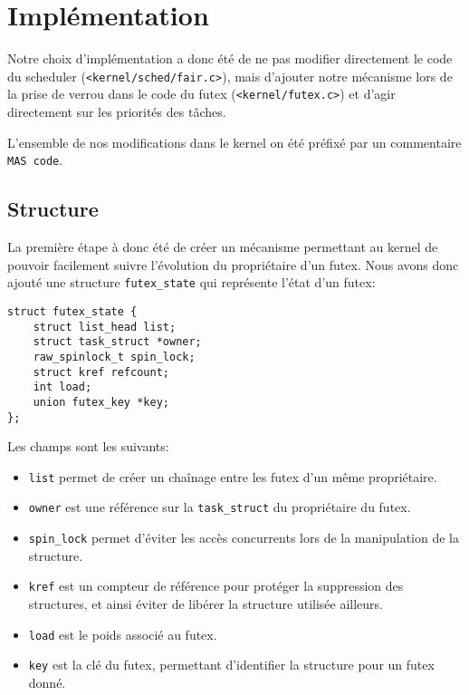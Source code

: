 \section{Implémentation}

Notre choix d'implémentation a donc été de ne pas modifier directement le code du scheduler (\verb|<kernel/sched/fair.c>|), mais d'ajouter notre mécanisme lors de la prise de
verrou dans le code
du futex (\verb|<kernel/futex.c>|) et d'agir directement sur les priorités des tâches.

L'ensemble de nos modifications dans le kernel on été préfixé par un commentaire \verb|MAS code|.

\subsection{Structure}

La première étape à donc été de créer un mécanisme permettant au kernel de pouvoir facilement
suivre l'évolution du propriétaire d'un futex.
Nous avons donc ajouté une structure \verb|futex_state| qui représente l'état d'un
futex:

\begin{lstlisting}[tabsize=4]
struct futex_state {
	struct list_head list;
	struct task_struct *owner;
	raw_spinlock_t spin_lock;
	struct kref refcount;
	int load;
	union futex_key *key;
};
\end{lstlisting}

Les champs sont les suivants:
\begin{itemize}
	\item \verb|list| permet de créer un chaînage entre les futex d'un même propriétaire.
	
	\item \verb|owner| est une référence sur la \verb|task_struct| du propriétaire du futex.
	
	\item \verb|spin_lock| permet d'éviter les accès concurrents lors de la manipulation de
	la structure.
	
	\item \verb|kref| est un compteur de référence pour protéger la suppression
	des structures, et ainsi éviter de libérer la structure utilisée ailleurs.
	
	\item \verb|load| est le poids associé au futex.
	
	\item \verb|key| est la clé du futex, permettant d'identifier la structure pour un 
	futex donné.
\end{itemize}
\hspace{1cm}

